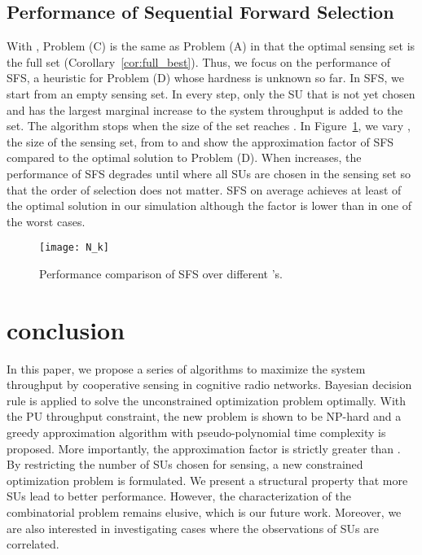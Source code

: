 \documentclass[conference]{IEEEtran}
\begin{document}
\subsection{Performance of Sequential Forward Selection}
\label{subsec:CD}

With , Problem (C) is the same as Problem (A) in that the optimal sensing set is the full set (Corollary~\ref{cor:full_best}). Thus, we focus on the performance of SFS, a heuristic for Problem (D) whose hardness is unknown so far. In SFS, we start from an empty sensing set. In every step, only the SU that is not yet chosen and has the largest marginal increase to the system throughput is added to the set. The algorithm stops when the size of the set reaches . In Figure~\ref{fig:N_k}, we vary , the size of the sensing set, from  to  and show the approximation factor of SFS compared to the optimal solution to Problem (D). When  increases, the performance of SFS degrades until  where all SUs are chosen in the sensing set so that the order of selection does not matter. SFS on average achieves at least  of the optimal solution in our simulation although the factor is lower than  in one of the worst cases.   

\begin{figure}[tb]
    \begin{center}
    \setlength{\unitlength}{1in}
    \texttt{[image: N\_k]}
    \end{center}
\vspace{-1.5em}
\caption{Performance comparison of SFS over different 's.}
\vspace{-2em}
\label{fig:N_k}
\end{figure}

\section{conclusion}
\label{sec:con}
In this paper, we propose a series of algorithms to maximize the system throughput by cooperative sensing in cognitive radio networks. Bayesian decision rule is applied to solve the unconstrained optimization problem optimally. With the PU throughput constraint, the new problem is shown to be NP-hard and a greedy approximation algorithm with pseudo-polynomial time complexity is proposed. More importantly, the approximation factor is strictly greater than . By restricting the number of SUs chosen for sensing, a new constrained optimization problem is formulated. We present a structural property that more SUs lead to better performance. However, the characterization of the combinatorial problem remains elusive, which is our future work. Moreover, we are also interested in investigating cases where the observations of SUs are correlated.  

\begin{spacing}{0.9}

\small

\end{spacing}
\end{document}
